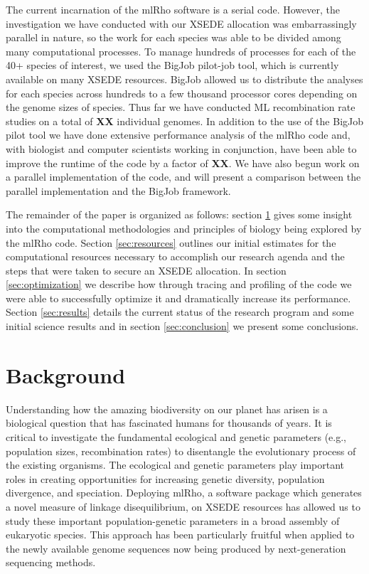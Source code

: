 \documentclass{sig-alternate}
\begin{document}
The current incarnation of the mlRho software is a serial code. However, the investigation we have conducted
with our XSEDE allocation was embarrassingly parallel in nature, so the work for each species was able to be
divided among many computational processes. To manage hundreds of processes for each of the 40+ species of
interest, we used the BigJob pilot-job tool, which is currently available on many XSEDE resources. BigJob
allowed us to distribute the analyses for each species across hundreds to a few thousand processor cores
depending on the genome sizes of species. Thus far we have conducted ML recombination rate studies on a total
of {\bf XX} individual genomes. In addition to the use of the BigJob pilot tool we have done extensive performance
analysis of the mlRho code and, with biologist and computer scientists working in conjunction, have been able
to improve the runtime of the code by a factor of {\bf XX}. We have also begun work on a parallel
implementation of the code, and will present a comparison between the parallel implementation and the BigJob
framework.

The remainder of the paper is organized as follows: section \ref{sec:background} gives some insight into the
computational methodologies and principles of biology being explored by the mlRho code. Section
\ref{sec:resources} outlines our initial estimates for the computational resources necessary to accomplish our
research agenda and the steps that were taken to secure an XSEDE allocation. In section \ref{sec:optimization}
we describe how through tracing and profiling of the code we were able to successfully optimize it and
dramatically increase its performance. Section \ref{sec:results} details the current status of the research
program and some initial science results and in section \ref{sec:conclusion} we present some conclusions.


\section{Background}\label{sec:background}
Understanding how the amazing biodiversity on our planet has arisen is a biological question that has
fascinated humans for thousands of years. It is critical to investigate the fundamental ecological and genetic
parameters (e.g., population sizes, recombination rates) to disentangle the evolutionary process of the
existing organisms. The ecological and genetic parameters play important roles in creating opportunities for
increasing genetic diversity, population divergence, and speciation. Deploying mlRho, a software package which
generates a novel measure of linkage disequilibrium, on XSEDE resources has allowed us to study these
important population-genetic parameters in a broad assembly of eukaryotic species. This approach has been
particularly fruitful when applied to the newly available genome sequences now being produced by
next-generation sequencing methods.
\end{document}
